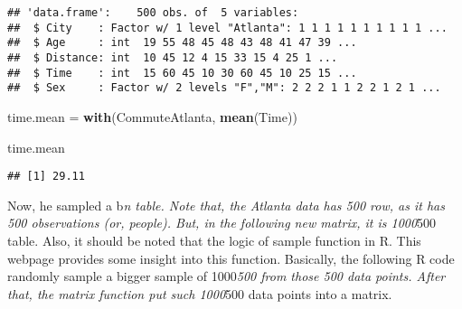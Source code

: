 \documentclass[]{book}
\newenvironment{Shaded}{\begin{snugshade}}{\end{snugshade}}
\newcommand{\DataTypeTok}[1]{\textcolor[rgb]{0.13,0.29,0.53}{#1}}
\newcommand{\DecValTok}[1]{\textcolor[rgb]{0.00,0.00,0.81}{#1}}
\newcommand{\KeywordTok}[1]{\textcolor[rgb]{0.13,0.29,0.53}{\textbf{#1}}}
\newcommand{\NormalTok}[1]{#1}
\newcommand{\OperatorTok}[1]{\textcolor[rgb]{0.81,0.36,0.00}{\textbf{#1}}}
\newcommand{\OtherTok}[1]{\textcolor[rgb]{0.56,0.35,0.01}{#1}}
\newcommand{\StringTok}[1]{\textcolor[rgb]{0.31,0.60,0.02}{#1}}
\begin{document}
\begin{verbatim}
## 'data.frame':    500 obs. of  5 variables:
##  $ City    : Factor w/ 1 level "Atlanta": 1 1 1 1 1 1 1 1 1 1 ...
##  $ Age     : int  19 55 48 45 48 43 48 41 47 39 ...
##  $ Distance: int  10 45 12 4 15 33 15 4 25 1 ...
##  $ Time    : int  15 60 45 10 30 60 45 10 25 15 ...
##  $ Sex     : Factor w/ 2 levels "F","M": 2 2 2 1 1 2 2 1 2 1 ...
\end{verbatim}

\begin{Shaded}
\begin{Highlighting}[]
\NormalTok{time.mean =}\StringTok{ }\KeywordTok{with}\NormalTok{(CommuteAtlanta, }\KeywordTok{mean}\NormalTok{(Time))}

\NormalTok{time.mean}
\end{Highlighting}
\end{Shaded}

\begin{verbatim}
## [1] 29.11
\end{verbatim}

Now, he sampled a b\emph{n table. Note that, the Atlanta data has 500 row, as it has 500 observations (or, people). But, in the following new matrix, it is 1000}500 table. Also, it should be noted that the logic of sample function in R. This webpage provides some insight into this function. Basically, the following R code randomly sample a bigger sample of 1000\emph{500 from those 500 data points. After that, the matrix function put such 1000}500 data points into a matrix.

\begin{Shaded}
\end{Shaded}


\end{document}
